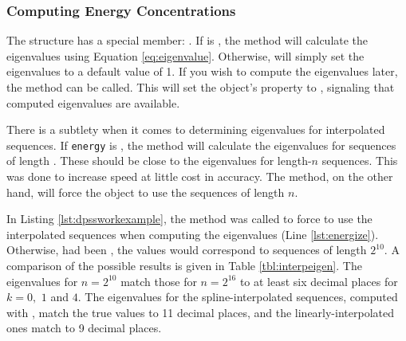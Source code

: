\subsubsection{Computing Energy Concentrations}

The  structure has a special member: .  If  is , the  method will calculate the eigenvalues using Equation \eqref{eq:eigenvalue}.  Otherwise,  will simply set the eigenvalues to a default value of 1.  If you wish to compute the eigenvalues later, the  method can be called.  This will set the object's  property to , signaling that computed eigenvalues are available.

There is a subtlety when it comes to determining eigenvalues for interpolated sequences.  If \texttt{energy} is , the  method will calculate the eigenvalues for sequences of length .  These should be close to the eigenvalues for length-$n$ sequences.  This was done to increase speed at little cost in accuracy.  The  method, on the other hand, will force the object to use the sequences of length $n$.

In Listing \ref{lst:dpssworkexample}, the  method was called to force  to use the interpolated sequences when computing the eigenvalues (Line \ref{lst:energize}).  Otherwise, had  been , the values would correspond to sequences of length $2^{10}$.  A comparison of the possible results is given in Table \ref{tbl:interpeigen}.  The eigenvalues for $n=2^{10}$ match those for $n=2^{16}$ to at least six decimal places for $k=0,$ $1$ and $4$.  The eigenvalues for the spline-interpolated sequences, computed with , match the true values to 11 decimal places, and the linearly-interpolated ones match to 9 decimal places.
\bigskip

